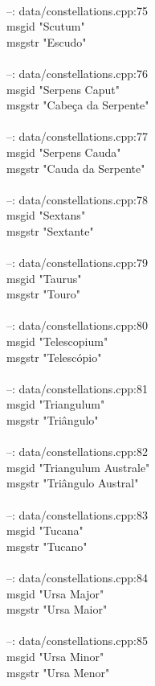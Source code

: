 \documentclass[10pt]{article}
\begin{document}
\\
--: data/constellations.cpp:75\\
msgid "Scutum"\\
msgstr "Escudo"\\
\\
--: data/constellations.cpp:76\\
msgid "Serpens Caput"\\
msgstr "Cabeça da Serpente"\\
\\
--: data/constellations.cpp:77\\
msgid "Serpens Cauda"\\
msgstr "Cauda da Serpente"\\
\\
--: data/constellations.cpp:78\\
msgid "Sextans"\\
msgstr "Sextante"\\
\\
--: data/constellations.cpp:79\\
msgid "Taurus"\\
msgstr "Touro"\\
\\
--: data/constellations.cpp:80\\
msgid "Telescopium"\\
msgstr "Telescópio"\\
\\
--: data/constellations.cpp:81\\
msgid "Triangulum"\\
msgstr "Triângulo"\\
\\
--: data/constellations.cpp:82\\
msgid "Triangulum Australe"\\
msgstr "Triângulo Austral"\\
\\
--: data/constellations.cpp:83\\
msgid "Tucana"\\
msgstr "Tucano"\\
\\
--: data/constellations.cpp:84\\
msgid "Ursa Major"\\
msgstr "Ursa Maior"\\
\\
--: data/constellations.cpp:85\\
msgid "Ursa Minor"\\
msgstr "Ursa Menor"\\
\end{document}
